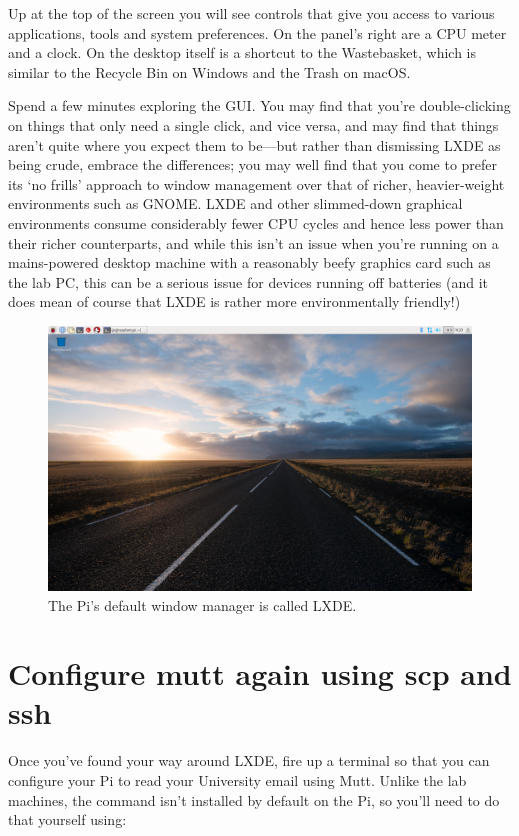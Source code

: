 Up at the top of the screen you will see controls that give you access
to various applications, tools and system preferences. On the panel's
right are a CPU meter and a clock. On the desktop itself is a shortcut
to the Wastebasket, which is similar to the Recycle Bin on Windows and
the Trash on macOS.

Spend a few minutes exploring the GUI. You may find that you're
double-clicking on things that only need a single click, and vice
versa, and may find that things aren't quite where you expect them to
be---but rather than dismissing LXDE as being crude, embrace the
differences; you may well find that you come to prefer its `no frills'
approach to window management over that of richer, heavier-weight
environments such as GNOME. LXDE and other slimmed-down graphical
environments consume considerably fewer CPU cycles and hence less
power than their richer counterparts, and while this isn't an issue
when you're running on a mains-powered desktop machine with a
reasonably beefy graphics card such as the lab PC, this can be a
serious issue for devices running off batteries (and it does mean of
course that LXDE is rather more environmentally friendly!)

\begin{figure}
\centerline{\includegraphics[width=14cm]{images/pi3-LXDE-AY17.png}}
\caption{The Pi's default window manager is called LXDE.}\label{figure:lxde-desktop}
\end{figure}

\section{Configure mutt again using scp and ssh}

Once you've found your way around LXDE, fire up a terminal so that you
can configure your Pi to read your University email using Mutt. Unlike
the lab machines, the  command isn't installed by
default on the Pi, so you'll need to do that yourself using:

